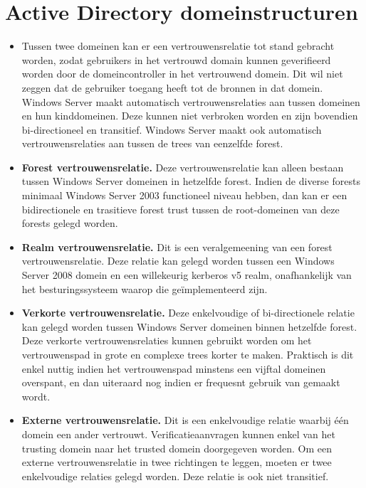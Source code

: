 	\section{Active Directory domeinstructuren }
	\begin{enumerate}
		 {
			\begin{itemize}
				\item Tussen twee domeinen kan er een vertrouwensrelatie tot stand gebracht worden, zodat gebruikers in het vertrouwd domain kunnen geverifieerd worden door de domeincontroller in het vertrouwend domein. Dit wil niet zeggen dat de gebruiker toegang heeft tot de bronnen in dat domein. Windows Server maakt automatisch vertrouwensrelaties aan tussen domeinen en hun kinddomeinen. Deze kunnen niet verbroken worden en zijn bovendien bi-directioneel en transitief. Windows Server maakt ook automatisch vertrouwensrelaties aan tussen de trees van eenzelfde forest.
			\end{itemize}
		}
		
		 { 
			\begin{itemize}
				\item \textbf{Forest vertrouwensrelatie.} Deze vertrouwensrelatie kan alleen bestaan tussen Windows Server domeinen in hetzelfde forest. Indien de diverse forests minimaal Windows Server 2003 functioneel niveau hebben, dan kan er een bidirectionele en trasitieve forest trust tussen de root-domeinen van deze forests gelegd worden. 
				\item \textbf{Realm vertrouwensrelatie.} Dit is een veralgemeening van een forest vertrouwensrelatie. Deze relatie kan gelegd worden tussen een Windows Server 2008 domein en een willekeurig kerberos v5 realm, onafhankelijk van het besturingssysteem waarop die geïmplementeerd zijn. 
				\item \textbf{Verkorte vertrouwensrelatie.} Deze enkelvoudige of bi-directionele relatie kan gelegd worden tussen Windows Server domeinen binnen hetzelfde forest. Deze verkorte vertrouwensrelaties kunnen gebruikt worden om het vertrouwenspad in grote en complexe trees korter te maken. Praktisch is dit enkel nuttig indien het vertrouwenspad minstens een vijftal domeinen overspant, en dan uiteraard nog indien er frequesnt gebruik van gemaakt wordt. 
				\item \textbf{Externe vertrouwensrelatie.} Dit is een enkelvoudige relatie waarbij één domein een ander vertrouwt. Verificatieaanvragen kunnen enkel van het trusting domein naar het trusted domein doorgegeven worden. Om een externe vertrouwensrelatie in twee richtingen te leggen, moeten er twee enkelvoudige relaties gelegd worden. Deze relatie is ook niet transitief.
			\end{itemize}

}
\end{enumerate}
